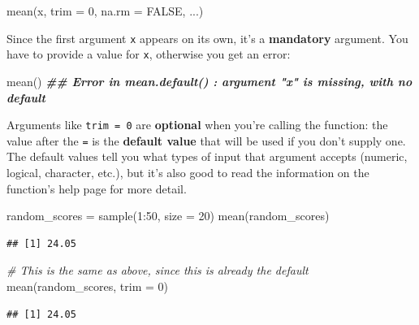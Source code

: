 \documentclass[
]{book}
\newenvironment{Shaded}{\begin{snugshade}}{\end{snugshade}}
\newcommand{\AttributeTok}[1]{\textcolor[rgb]{0.77,0.63,0.00}{#1}}
\newcommand{\CommentTok}[1]{\textcolor[rgb]{0.56,0.35,0.01}{\textit{#1}}}
\newcommand{\ConstantTok}[1]{\textcolor[rgb]{0.00,0.00,0.00}{#1}}
\newcommand{\DecValTok}[1]{\textcolor[rgb]{0.00,0.00,0.81}{#1}}
\newcommand{\DocumentationTok}[1]{\textcolor[rgb]{0.56,0.35,0.01}{\textbf{\textit{#1}}}}
\newcommand{\FunctionTok}[1]{\textcolor[rgb]{0.00,0.00,0.00}{#1}}
\newcommand{\NormalTok}[1]{#1}
\newcommand{\OtherTok}[1]{\textcolor[rgb]{0.56,0.35,0.01}{#1}}
\newcommand{\SpecialCharTok}[1]{\textcolor[rgb]{0.00,0.00,0.00}{#1}}
\begin{document}
\begin{Shaded}
\begin{Highlighting}[]
\FunctionTok{mean}\NormalTok{(x, }\AttributeTok{trim =} \DecValTok{0}\NormalTok{, }\AttributeTok{na.rm =} \ConstantTok{FALSE}\NormalTok{, ...)}
\end{Highlighting}
\end{Shaded}

Since the first argument \texttt{x} appears on its own, it's a \textbf{mandatory} argument.
You have to provide a value for \texttt{x}, otherwise you get an error:

\begin{Shaded}
\begin{Highlighting}[]
\FunctionTok{mean}\NormalTok{()}
\DocumentationTok{\#\# Error in mean.default() : argument "x" is missing, with no default}
\end{Highlighting}
\end{Shaded}

Arguments like \texttt{trim\ =\ 0} are \textbf{optional} when you're calling the function:
the value after the \texttt{=} is the \textbf{default value} that will be used if you don't
supply one. The default values tell you what types of input
that argument accepts (numeric, logical, character, etc.), but it's also good
to read the information on the function's help page for more detail.

\begin{Shaded}
\begin{Highlighting}[]
\NormalTok{random\_scores }\OtherTok{=} \FunctionTok{sample}\NormalTok{(}\DecValTok{1}\SpecialCharTok{:}\DecValTok{50}\NormalTok{, }\AttributeTok{size =} \DecValTok{20}\NormalTok{)}
\FunctionTok{mean}\NormalTok{(random\_scores)}
\end{Highlighting}
\end{Shaded}

\begin{verbatim}
## [1] 24.05
\end{verbatim}

\begin{Shaded}
\begin{Highlighting}[]
\CommentTok{\# This is the same as above, since this is already the default}
\FunctionTok{mean}\NormalTok{(random\_scores, }\AttributeTok{trim =} \DecValTok{0}\NormalTok{)}
\end{Highlighting}
\end{Shaded}

\begin{verbatim}
## [1] 24.05
\end{verbatim}
\end{document}
